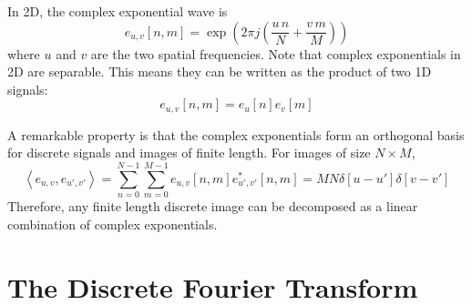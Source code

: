 

In 2D, the complex exponential wave is
\begin{equation}
e_{u,v}\left[n,m\right] = \exp \left(2 \pi j \left(  \frac{u\, n}{N}  + \frac{v\,m}{M}  \right) \right) 
\end{equation}
where $u$ and $v$ are the two spatial frequencies. Note that complex exponentials in 2D are separable. This means they can be written as the product of two 1D signals:
\begin{equation}
e_{u,v}\left[n,m\right]   = e_{u}\left[n\right] e_{v}\left[m\right] 
\end{equation}

 

%

A remarkable property is that the complex exponentials form an orthogonal basis for discrete signals and images of finite length. For images of size $N \times M$,
\begin{equation}
\left<e_{u,v}, e_{u',v'} \right> = \sum_{n=0}^{N-1} \sum_{m=0}^{M-1} e_{u,v}\left[n,m\right] e^*_{u',v'}\left[n,m\right] = MN \delta \left[u-u'\right]\delta \left[v-v'\right] 
\end{equation}
Therefore, any finite length discrete image can be decomposed as a linear combination of complex exponentials. 


%
%


\section{The Discrete Fourier Transform}

